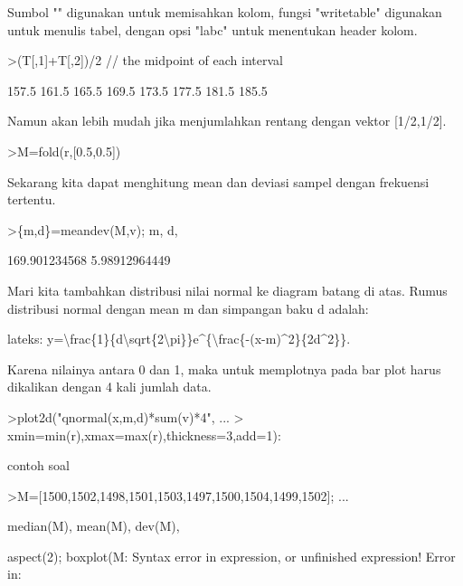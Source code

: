 \documentclass[a4paper,10pt]{article}
\begin{document}
\begin{eulernotebook}
\begin{eulercomment}
\begin{eulercomment}
\begin{eulercomment}
Sumbol "\textbar{}" digunakan untuk memisahkan kolom, fungsi "writetable"
digunakan untuk menulis tabel, dengan opsi "labc" untuk menentukan
header kolom.
\end{eulercomment}
\begin{eulerprompt}
>(T[,1]+T[,2])/2 // the midpoint of each interval
\end{eulerprompt}
\begin{euleroutput}
          157.5 
          161.5 
          165.5 
          169.5 
          173.5 
          177.5 
          181.5 
          185.5 
\end{euleroutput}
\begin{eulercomment}
Namun akan lebih mudah jika menjumlahkan rentang dengan vektor
[1/2,1/2].
\end{eulercomment}
\begin{eulerprompt}
>M=fold(r,[0.5,0.5])
\end{eulerprompt}
\begin{euleroutput}
  [157.5,  161.5,  165.5,  169.5,  173.5,  177.5,  181.5,  185.5]
\end{euleroutput}
\begin{eulercomment}
Sekarang kita dapat menghitung mean dan deviasi sampel dengan
frekuensi tertentu.
\end{eulercomment}
\begin{eulerprompt}
>\{m,d\}=meandev(M,v); m, d,
\end{eulerprompt}
\begin{euleroutput}
  169.901234568
  5.98912964449
\end{euleroutput}
\begin{eulercomment}
Mari kita tambahkan distribusi nilai normal ke diagram batang di atas.
Rumus distribusi normal dengan mean m dan simpangan baku d adalah:

lateks: y=\textbackslash{}frac\{1\}\{d\textbackslash{}sqrt\{2\textbackslash{}pi\}\}e\textasciicircum{}\{\textbackslash{}frac\{-(x-m)\textasciicircum{}2\}\{2d\textasciicircum{}2\}\}.

Karena nilainya antara 0 dan 1, maka untuk memplotnya pada bar plot
harus dikalikan dengan 4 kali jumlah data.
\end{eulercomment}
\begin{eulerprompt}
>plot2d("qnormal(x,m,d)*sum(v)*4", ...
>  xmin=min(r),xmax=max(r),thickness=3,add=1):
\end{eulerprompt}
\eulersubheading{}
\begin{eulercomment}
contoh soal
\end{eulercomment}
\begin{eulerprompt}
>M=[1500,1502,1498,1501,1503,1497,1500,1504,1499,1502]; ...  
\end{eulerprompt}
\begin{euleroutput}
  median(M), mean(M), dev(M),
\end{euleroutput}
\begin{euleroutput}
  aspect(2); boxplot(M:
  Syntax error in expression, or unfinished expression!
  Error in:
  

\end{euleroutput}
\end{eulercomment}
\end{eulercomment}
\end{eulernotebook}
\end{document}
